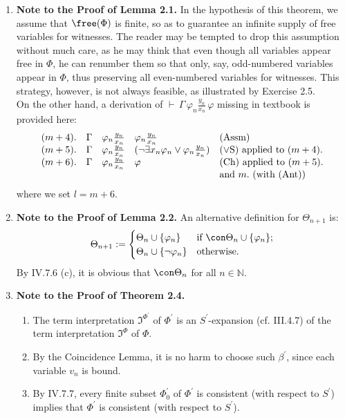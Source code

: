 \begin{enumerate}[1.]
\item \textbf{Note to the Proof of Lemma 2.1.} In the hypothesis of this theorem, we assume that $\free(\Phi)$ is finite, so as to guarantee an infinite supply of free variables for witnesses. The reader may be tempted to drop this assumption without much care, as he may think that even though all variables appear free in $\Phi$, he can renumber them so that only, say, odd-numbered variables appear in $\Phi$, thus preserving all even-numbered variables for witnesses. This strategy, however, is not always feasible, as illustrated by Exercise 2.5.\newline
\\
On the other hand, a derivation of $\vdash \, \Gamma \, \varphi_n \frac{y_n}{x_n} \, \varphi$ missing in textbook is provided here:
\[
\begin{array}{lllll}
(m+4). & \Gamma & \varphi_n \frac{y_n}{x_n} & \varphi_n \frac{y_n}{x_n} & \mbox{(Assm)} \cr
(m+5). & \Gamma & \varphi_n \frac{y_n}{x_n} & (\neg \exists x_n \varphi_n \lor \varphi_n \frac{y_n}{x_n}) & \mbox{($\lor$S) applied to $(m+4).$} \cr
(m+6). & \Gamma & \varphi_n \frac{y_n}{x_n} & \varphi & \mbox{(Ch) applied to $(m+5).$} \cr
\ & \ & \ & \ & \mbox{and $m.$ (with (Ant))}
\end{array}
\]
where we set $l = m+6$.
%
\item \textbf{Note to the Proof of Lemma 2.2.} An alternative definition for $\Theta_{n + 1}$ is:
\[
\Theta_{n + 1} := \begin{cases}
\Theta_n \cup \{ \varphi_n \} & \mbox{if \(\con \Theta_n \cup \{ \varphi_n \}\)}; \cr
\Theta_n \cup \{ \neg\varphi_n \} & \mbox{otherwise}.
\end{cases}
\]
By IV.7.6 (c), it is obvious that $\con \Theta_n$ for all $n \in \mathbb{N}$. 
%
\item \textbf{Note to the Proof of Theorem 2.4.}
\begin{enumerate}[(1)]
\item The term interpretation $\mathfrak{I}^{\Phi^\prime}$ of $\Phi^\prime$ is an $S^\prime$-expansion (cf. III.4.7) of the term interpretation $\mathfrak{I}^\Phi$ of $\Phi$.
\item By the Coincidence Lemma, it is no harm to choose such $\beta^\prime$, since each variable $v_n$ is bound.
\item By IV.7.7, every finite subset $\Phi_0^\prime$ of $\Phi^\prime$ is consistent (with respect to $S^\prime$) implies that $\Phi^\prime$ is consistent (with respect to $S^\prime$).

\end{enumerate}
\end{enumerate}
